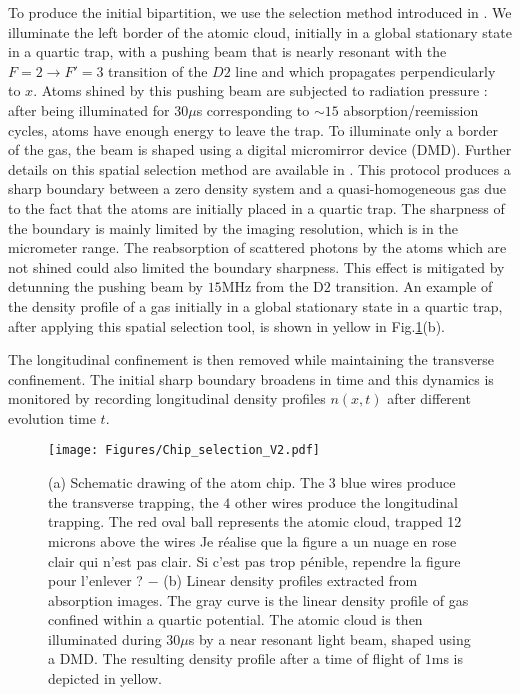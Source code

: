 To produce the initial bipartition, we use the selection method introduced in \cite{PhysRevLett.133.113402}. We illuminate the left border of the atomic cloud, initially in a global stationary state in a quartic trap, with a pushing beam that is nearly resonant with the $F=2 \to F' = 3$ transition of the $D2$ line and which propagates perpendicularly to $x$. Atoms shined by this pushing beam are subjected to radiation pressure : after being illuminated for $30 \mu$s corresponding to $\sim 15$ absorption/reemission cycles, atoms
have enough energy to leave the trap. To illuminate only a border of the gas, the beam is shaped using a digital micromirror device (DMD). Further details on this spatial selection method are available in \cite{PhysRevLett.133.113402}. This protocol produces a sharp boundary between a zero density system and a quasi-homogeneous gas due to the fact that the atoms are initially placed in a quartic trap.  The sharpness of the boundary is mainly limited by the imaging resolution, which is in the micrometer range. The reabsorption of scattered photons by the atoms which are not shined could also limited the boundary sharpness. This effect is mitigated by detunning the pushing beam by $15$MHz from the D$2$ transition. An example of the density profile of a gas initially in a global stationary state in a quartic trap, after applying this spatial selection tool, is shown in yellow in Fig.\ref{fig:setup}(b).  %

The longitudinal confinement is then removed while maintaining the transverse confinement. The initial sharp boundary broadens in time 
and this  dynamics is monitored by recording longitudinal density profiles $n(x,t)$ after different evolution time $t$. %
\begin{figure}[!htb]
    \centering
    \texttt{[image: Figures/Chip\_selection\_V2.pdf]}
    \caption{%
    (a) Schematic drawing of the atom chip. The $3$ blue wires produce the transverse trapping, the $4$ other wires produce the longitudinal trapping. The red oval ball represents the atomic cloud, trapped 12 microns above the wires {\color{blue} Je réalise que la figure a un nuage en rose clair qui n'est pas clair. Si c'est pas trop pénible, rependre la figure pour l'enlever ? } $-$ (b) {\color{blue} Linear density profiles extracted from absorption images.} The gray curve is the linear density profile of gas confined within a quartic potential. The atomic cloud is then illuminated during $30 \mu$s by a near resonant light beam, shaped using a DMD. The resulting density profile after a time of flight of $1$ms is depicted in yellow. }
    \label{fig:setup}
\end{figure}


